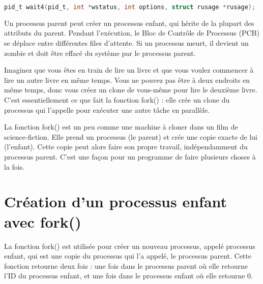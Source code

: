 \documentclass[12pt]{report}
\begin{document}
  \begin{lstlisting}[language=C]  pid_t wait4(pid_t, int *wstatus, int options, struct rusage *rusage);  \end{lstlisting}  
  \begin{tcolorbox}[    colback=yellow!10,    colframe=yellow,    title={\fontfamily{lmr}\selectfont \faBookmark\ À retenir},    fonttitle=\bfseries,    fontupper=\fontfamily{lmr}\selectfont,    boxrule=1pt,    sharp corners,      ]  Un processus parent peut créer un processus enfant, qui hérite de la plupart des attributs du parent. Pendant l'exécution, le Bloc de Contrôle de Processus (PCB) se déplace entre différentes files d'attente. Si un processus meurt, il devient un zombie et doit être effacé du système par le processus parent.  \end{tcolorbox}  

\begin{tcolorbox}[ 
colback=green!10, 
colframe=green, 
title={\fontfamily{lmr}\selectfont \faLightbulb\ Intuition}, 
fonttitle=\bfseries, 
fontupper=\fontfamily{lmr}\selectfont, 
boxrule=1pt, 
sharp corners, 
] 
Imaginez que vous êtes en train de lire un livre et que vous voulez commencer à lire un autre livre en même temps. Vous ne pouvez pas être à deux endroits en même temps, donc vous créez un clone de vous-même pour lire le deuxième livre. C'est essentiellement ce que fait la fonction fork() : elle crée un clone du processus qui l'appelle pour exécuter une autre tâche en parallèle. 
\end{tcolorbox}
\begin{tcolorbox}[ 
colback=blue!10, 
colframe=blue, 
title={\fontfamily{lmr}\selectfont \faComment\ Vulgarisation simple}, 
fonttitle=\bfseries, 
fontupper=\fontfamily{lmr}\selectfont, 
boxrule=1pt, 
sharp corners, 
] 
La fonction fork() est un peu comme une machine à cloner dans un film de science-fiction. Elle prend un processus (le parent) et crée une copie exacte de lui (l'enfant). Cette copie peut alors faire son propre travail, indépendamment du processus parent. C'est une façon pour un programme de faire plusieurs choses à la fois. 
\end{tcolorbox}
\section{Création d'un processus enfant avec fork()} 

La fonction fork() est utilisée pour créer un nouveau processus, appelé processus enfant, qui est une copie du processus qui l'a appelé, le processus parent. Cette fonction retourne deux fois : une fois dans le processus parent où elle retourne l'ID du processus enfant, et une fois dans le processus enfant où elle retourne 0. 
\end{document}
